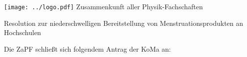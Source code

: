 \documentclass[DIV=calc]{scrartcl}
\begin{document}
\hspace{0.87\textwidth}
\begin{minipage}{120pt}
	\vspace{-1.8cm}
	\texttt{[image: ../logo.pdf]}
	\centering
	\small Zusammenkunft aller Physik-Fachschaften
\end{minipage}

\begin{center}
  \huge{Resolution zur niederschwelligen Bereitstellung von Menstruationsprodukten an Hochschulen}\vspace{.25\baselineskip}\\
  \normalsize
\end{center}
\vspace{1cm}

%
%
%



Die ZaPF schließt sich folgendem Antrag der KoMa an:\\

\end{document}
